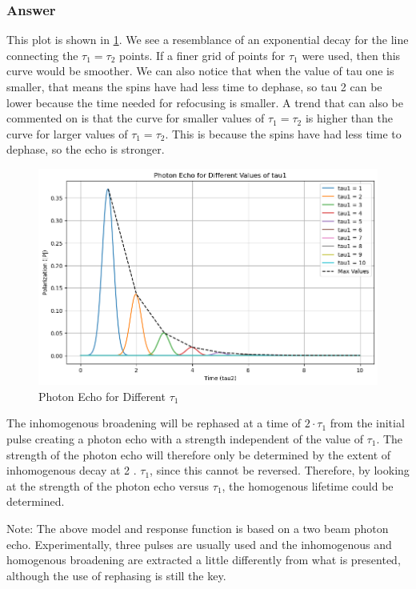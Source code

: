 \documentclass[12pt]{article}
\begin{document}
\subsubsection{Answer}
This plot is shown in \ref{fig:echo2}. We see a resemblance of an exponential decay for the line connecting the $\tau_{1}=\tau_{2}$ points. If a finer grid of points for $\tau_{1}$ were used, then this curve would be smoother. We can also notice that when the value of tau one is smaller, that means the spins have had less time to dephase, so tau 2 can be lower because the time needed for refocusing is smaller. A trend that can also be commented on is that the curve for smaller values of $\tau_1 = \tau_2$ is higher than the curve for larger values of $\tau_1 = \tau_2$. This is because the spins have had less time to dephase, so the echo is stronger.\\
\begin{figure}
  \centering
  \includegraphics[max width=\textwidth]{echo2.png}
  \caption{Photon Echo for Different $\tau_{1}$}
  \label{fig:echo2}
\end{figure}

The inhomogenous broadening will be rephased at a time of $2 \cdot \tau_{1}$ from the initial pulse creating a photon echo with a strength independent of the value of $\tau_{1}$. The strength of the photon echo will therefore only be determined by the extent of inhomogenous decay at 2 . $\tau_{1}$, since this cannot be reversed. Therefore, by looking at the strength of the photon echo versus $\tau_{1}$, the homogenous lifetime could be determined.

Note: The above model and response function is based on a two beam photon echo. Experimentally, three pulses are usually used and the inhomogenous and homogenous broadening are extracted a little differently from what is presented, although the use of rephasing is still the key.
\end{document}
